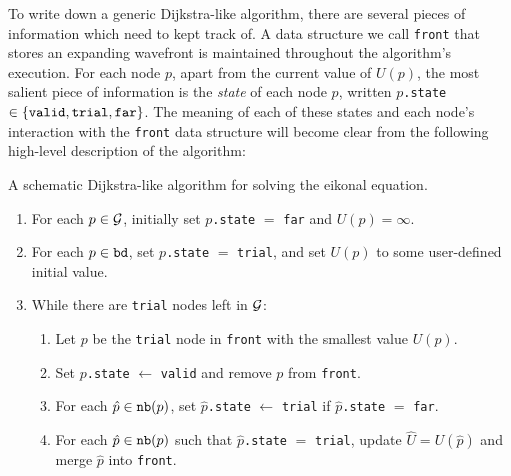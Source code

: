 \documentclass[eikonal.tex]{subfiles}
\begin{document}
To write down a generic Dijkstra-like algorithm, there are several
pieces of information which need to kept track of. A data structure we
call \texttt{front} that stores an expanding wavefront is maintained
throughout the algorithm's execution. For each node $p$, apart from
the current value of $U(p)$, the most salient piece of information is
the \emph{state} of each node $p$, written $p$\texttt{.state}
$\in \left\{\texttt{valid}, \texttt{trial}, \texttt{far}\right\}$. The meaning
of each of these states and each node's interaction with the
\texttt{front} data structure will become clear from the following
high-level description of the algorithm:

\begin{algorithm}
  \caption{A schematic Dijkstra-like algorithm for solving the eikonal
    equation.}\label{alg:dijkstra-like}
  \begin{enumerate}[nolistsep]
  \item For each $p \in \mathcal{G}$, initially set $p$\texttt{.state} $=$
    \texttt{far} and $U(p) = \infty$.
  \item For each $p \in \texttt{bd}$, set $p$\texttt{.state} $=$
    \texttt{trial}, and set $U(p)$ to some user-defined initial value.
  \item While there are \texttt{trial} nodes left in $\mathcal{G}$:
    \begin{enumerate}[nolistsep]
    \item Let $p$ be the \texttt{trial} node in \texttt{front} with
      the smallest value $U(p)$.\label{enum:get-node}
    \item Set $p$\texttt{.state} $\gets$ \texttt{valid} and remove $p$
      from \texttt{front}.
    \item For each $\hat{p} \in \texttt{nb}(p)$, set
      $\hat{p}$\texttt{.state} $\gets$ \texttt{trial} if
      $\hat{p}$\texttt{.state} $=$ \texttt{far}.\label{enum:set-trial}
    \item For each $\hat{p} \in \texttt{nb}(p)$ such that
      $\hat{p}$\texttt{.state} $=$ \texttt{trial}, update
      $\hat{U} = U(\hat{p})$ and merge $\hat{p}$ into
      \texttt{front}.\label{enum:update-U}
    \end{enumerate}
  \end{enumerate}
\end{algorithm}
\end{document}
